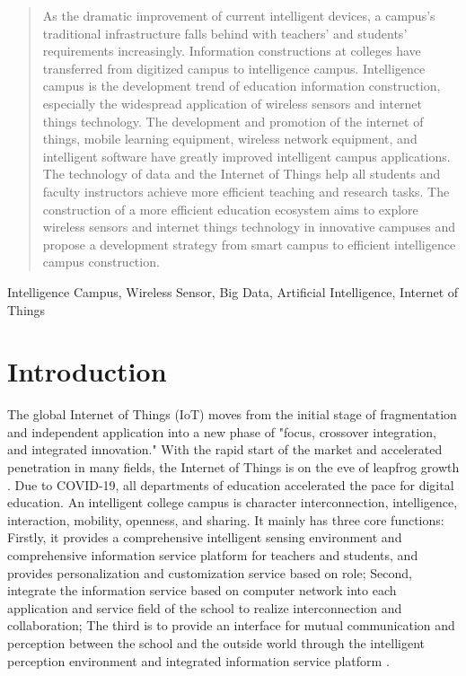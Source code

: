 \documentclass[conference]{IEEEtran}
\begin{document}
\begin{abstract}
As the dramatic improvement of current intelligent devices, a campus's traditional infrastructure falls behind with teachers' and students' requirements increasingly. Information constructions at colleges have transferred from digitized campus to intelligence campus. Intelligence campus is the development trend of education information construction, especially the widespread application of wireless sensors and internet things technology. The development and promotion of the internet of things, mobile learning equipment, wireless network equipment, and intelligent software have greatly improved intelligent campus applications. The technology of data and the Internet of Things help all students and faculty instructors achieve more efficient teaching and research tasks. The construction of a more efficient education ecosystem aims to explore wireless sensors and internet things technology in innovative campuses and propose a development strategy from smart campus to efficient intelligence campus construction.


\end{abstract} 

\begin{IEEEkeywords}
Intelligence Campus, Wireless Sensor, Big Data, Artificial Intelligence, Internet of Things
\end{IEEEkeywords}

\section{Introduction}
The global Internet of Things (IoT) moves from the initial stage of fragmentation and independent application into a new phase of "focus, crossover integration, and integrated innovation." With the rapid start of the market and accelerated penetration in many fields, the Internet of Things is on the eve of leapfrog growth \cite{INTCAMPUS:ResearchOnApp}. Due to COVID-19, all departments of education accelerated the pace for digital education. An intelligent college campus is character interconnection, intelligence, interaction, mobility, openness, and sharing. It mainly has three core functions: Firstly, it provides a comprehensive intelligent sensing environment and comprehensive information service platform for teachers and students, and provides personalization and customization service based on role; Second, integrate the information service based on computer network into each application and service field of the school to realize interconnection and collaboration; The third is to provide an interface for mutual communication and perception between the school and the outside world through the intelligent perception environment and integrated information service platform \cite{INTCAMPUS:TechDevelop}. 
\end{document}
